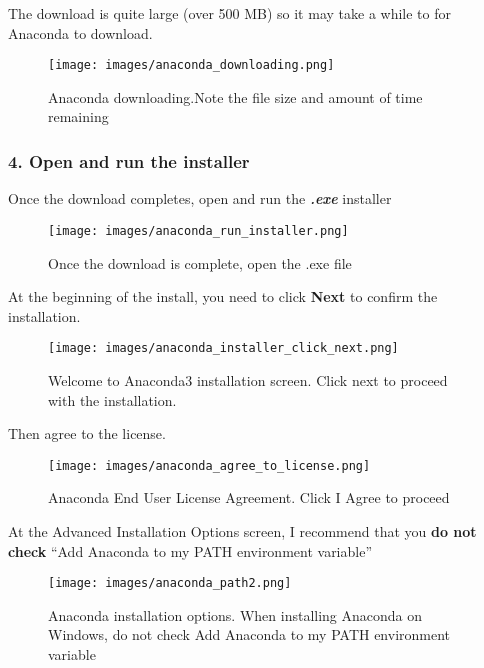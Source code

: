 \documentclass{book}
\makeatletter
\def\maxwidth{\ifdim\Gin@nat@width>\linewidth\linewidth
\else\Gin@nat@width\fi}
\let\Oldincludegraphics\includegraphics
\renewcommand{\includegraphics}[1]{\Oldincludegraphics[width=.8\maxwidth]{#1}}
\makeatother
\begin{document}
The download is quite large (over 500 MB) so it may take a while to for
Anaconda to download.

\begin{figure}
\centering
\texttt{[image: images/anaconda\_downloading.png]}
\caption{Anaconda downloading.Note the file size and amount of time
remaining}
\end{figure}
    




    
        \hypertarget{open-and-run-the-installer}{%
\subsubsection{4. Open and run the
installer}\label{open-and-run-the-installer}}

Once the download completes, open and run the \textbf{\emph{.exe}}
installer

\begin{figure}
\centering
\texttt{[image: images/anaconda\_run\_installer.png]}
\caption{Once the download is complete, open the .exe file}
\end{figure}

At the beginning of the install, you need to click \textbf{Next} to
confirm the installation.

\begin{figure}
\centering
\texttt{[image: images/anaconda\_installer\_click\_next.png]}
\caption{Welcome to Anaconda3 installation screen. Click next to proceed
with the installation.}
\end{figure}

Then agree to the license.

\begin{figure}
\centering
\texttt{[image: images/anaconda\_agree\_to\_license.png]}
\caption{Anaconda End User License Agreement. Click I Agree to proceed}
\end{figure}

At the Advanced Installation Options screen, I recommend that you
\textbf{do not check} ``Add Anaconda to my PATH environment variable''

\begin{figure}
\centering
\texttt{[image: images/anaconda\_path2.png]}
\caption{Anaconda installation options. When installing Anaconda on
Windows, do not check Add Anaconda to my PATH environment variable}
\end{figure}
    
\end{document}
